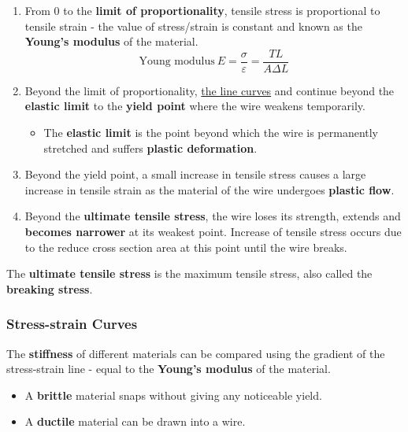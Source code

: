 \begin{enumerate}
    \item From 0 to the \textbf{limit of proportionality}, tensile stress is proportional to tensile strain - the value of stress/strain is constant and known as the \textbf{Young's modulus} of the material.
        $$\text{Young modulus}\ E=\frac{\sigma}{\varepsilon}=\frac{TL}{A\Delta L}$$
    \item Beyond the limit of proportionality, \underline{the line curves} and continue beyond the \textbf{elastic limit} to the \textbf{yield point} where the wire weakens temporarily.
        \begin{itemize}
            \item The \textbf{elastic limit} is the point beyond which the wire is permanently stretched and suffers \textbf{plastic deformation}.
        \end{itemize}
    \item Beyond the yield point, a small increase in tensile stress causes a large increase in tensile strain as the material of the wire undergoes \textbf{plastic flow}.
    \item Beyond the \textbf{ultimate tensile stress}, the wire loses its strength, extends and \textbf{becomes narrower} at its weakest point. Increase of tensile stress occurs due to the reduce cross section area at this point until the wire breaks.
\end{enumerate}

The \textbf{ultimate tensile stress} is the maximum tensile stress, also called the \textbf{breaking stress}.

\subsubsection*{Stress-strain Curves}

The \textbf{stiffness} of different materials can be compared using the gradient of the stress-strain line - equal to the \textbf{Young's modulus} of the material.
\begin{itemize}
    \item A \textbf{brittle} material snaps without giving any noticeable yield.
    \item A \textbf{ductile} material can be drawn into a wire.
\end{itemize}
